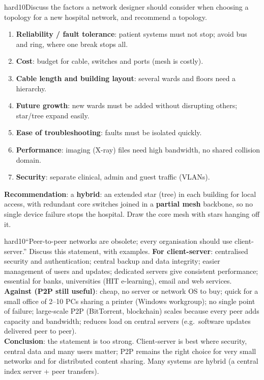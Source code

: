 \documentclass[10pt]{article}
\begin{document}
\begin{practice}{hard}{10}Discuss the factors a network designer should consider when choosing a topology for a new hospital network, and recommend a topology.
\sol
\begin{enumerate}
\item \textbf{Reliability / fault tolerance}: patient systems must not stop; avoid bus and ring, where one break stops all.
\item \textbf{Cost}: budget for cable, switches and ports (mesh is costly).
\item \textbf{Cable length and building layout}: several wards and floors need a hierarchy.
\item \textbf{Future growth}: new wards must be added without disrupting others; star/tree expand easily.
\item \textbf{Ease of troubleshooting}: faults must be isolated quickly.
\item \textbf{Performance}: imaging (X-ray) files need high bandwidth, no shared collision domain.
\item \textbf{Security}: separate clinical, admin and guest traffic (VLANs).
\end{enumerate}
\textbf{Recommendation}: a \textbf{hybrid}: an extended star (tree) in each building for local access, with redundant core switches joined in a \textbf{partial mesh} backbone, so no single device failure stops the hospital. Draw the core mesh with stars hanging off it.
\end{practice}

\begin{practice}{hard}{10}``Peer-to-peer networks are obsolete; every organisation should use client-server.'' Discuss this statement, with examples.
\sol
\textbf{For client-server}: centralised security and authentication; central backup and data integrity; easier management of users and updates; dedicated servers give consistent performance; essential for banks, universities (HIT e-learning), email and web services.\\
\textbf{Against (P2P still useful)}: cheap, no server or network OS to buy; quick for a small office of 2--10 PCs sharing a printer (Windows workgroup); no single point of failure; large-scale P2P (BitTorrent, blockchain) scales because every peer adds capacity and bandwidth; reduces load on central servers (e.g.\ software updates delivered peer to peer).\\
\textbf{Conclusion}: the statement is too strong. Client-server is best where security, central data and many users matter; P2P remains the right choice for very small networks and for distributed content sharing. Many systems are hybrid (a central index server + peer transfers).
\end{practice}
\end{document}
